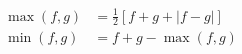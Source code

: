\begin{remark}
	\begin{equation}
	\begin{split}
	\max \left( {f,g} \right) & = \frac{1}{2}\left[ {f + g + \left| {f - g} \right|} \right]\\
	\min \left( {f,g} \right) & = f + g - \max \left( {f,g} \right)
	\end{split}
	\label{eq11.4}
	\end{equation}
\end{remark}